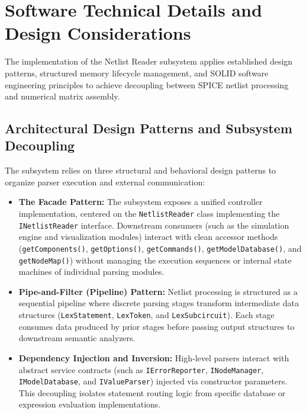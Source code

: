 \section{Software Technical Details and Design Considerations}
\label{sec:sw_technical_details}

The implementation of the Netlist Reader subsystem applies established design patterns, structured memory lifecycle management, and SOLID software engineering principles to achieve decoupling between SPICE netlist processing and numerical matrix assembly.

\subsection{Architectural Design Patterns and Subsystem Decoupling}

The subsystem relies on three structural and behavioral design patterns to organize parser execution and external communication:

\begin{itemize}
    \item \textbf{The Facade Pattern:} The subsystem exposes a unified controller implementation, centered on the \texttt{NetlistReader} class implementing the \texttt{INetlistReader} interface. Downstream consumers (such as the simulation engine and visualization modules) interact with clean accessor methods (\texttt{getComponents()}, \texttt{getOptions()}, \texttt{getCommands()}, \texttt{getModelDatabase()}, and \texttt{getNodeMap()}) without managing the execution sequences or internal state machines of individual parsing modules.
    \item \textbf{Pipe-and-Filter (Pipeline) Pattern:} Netlist processing is structured as a sequential pipeline where discrete parsing stages transform intermediate data structures (\texttt{LexStatement}, \texttt{LexToken}, and \texttt{LexSubcircuit}). Each stage consumes data produced by prior stages before passing output structures to downstream semantic analyzers.
    \item \textbf{Dependency Injection and Inversion:} High-level parsers interact with abstract service contracts (such as \texttt{IErrorReporter}, \texttt{INodeManager}, \texttt{IModelDatabase}, and \texttt{IValueParser}) injected via constructor parameters. This decoupling isolates statement routing logic from specific database or expression evaluation implementations.
\end{itemize}

